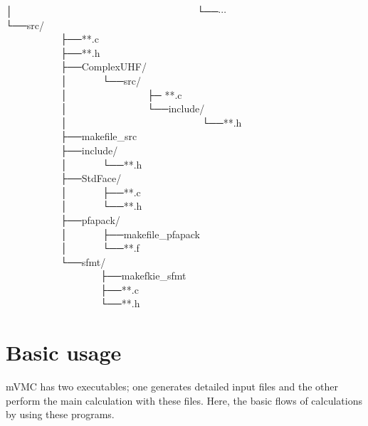 │~~~~~~~~~~~~~~~~~~~~~~~~~~~~~~~~~~~~~└──$\cdots$\\
└──src/\\
~~~~~~~~~~~├──**.c\\
~~~~~~~~~~~├──**.h\\
~~~~~~~~~~~├──ComplexUHF/\\
~~~~~~~~~~~│~~~~~~~└──src/\\
~~~~~~~~~~~│~~~~~~~~~~~~~~~~├─ **.c\\
~~~~~~~~~~~│~~~~~~~~~~~~~~~~└──include/\\
~~~~~~~~~~~│~~~~~~~~~~~~~~~~~~~~~~~~~~~└──**.h\\
~~~~~~~~~~~├──makefile\_src\\
~~~~~~~~~~~├──include/\\
~~~~~~~~~~~│~~~~~~~└──**.h\\
~~~~~~~~~~~├──StdFace/\\
~~~~~~~~~~~│~~~~~~~├──**.c\\
~~~~~~~~~~~│~~~~~~~└──**.h\\
~~~~~~~~~~~├──pfapack/\\
~~~~~~~~~~~│~~~~~~~├──makefile\_pfapack\\
~~~~~~~~~~~│~~~~~~~└──**.f\\
~~~~~~~~~~~└──sfmt/\\
~~~~~~~~~~~~~~~~~~~├──makefkie\_sfmt\\
~~~~~~~~~~~~~~~~~~~├──**.c\\
~~~~~~~~~~~~~~~~~~~└──**.h\\

\newpage
\section{Basic usage}
mVMC has two executables;
one generates detailed input files and the other perform the main calculation with these files.
Here, the basic flows of calculations by using these programs.

